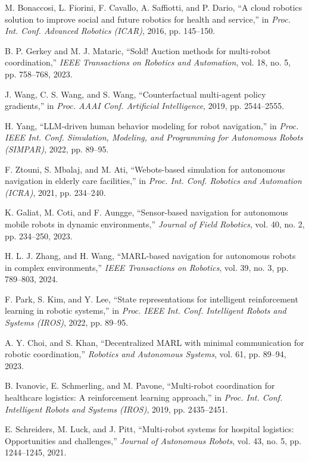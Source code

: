 \documentclass[conference]{IEEEtran}
\begin{document}
\begin{thebibliography}{1}
M. Bonaccosi, L. Fiorini, F. Cavallo, A. Saffiotti, and P. Dario, ``A cloud robotics solution to improve social and future robotics for health and service,'' in \emph{Proc. Int. Conf. Advanced Robotics (ICAR)}, 2016, pp. 145--150.

B. P. Gerkey and M. J. Mataric, ``Sold! Auction methods for multi-robot coordination,'' \emph{IEEE Transactions on Robotics and Automation}, vol. 18, no. 5, pp. 758--768, 2023.

J. Wang, C. S. Wang, and S. Wang, ``Counterfactual multi-agent policy gradients,'' in \emph{Proc. AAAI Conf. Artificial Intelligence}, 2019, pp. 2544--2555.

H. Yang, ``LLM-driven human behavior modeling for robot navigation,'' in \emph{Proc. IEEE Int. Conf. Simulation, Modeling, and Programming for Autonomous Robots (SIMPAR)}, 2022, pp. 89--95.

F. Ztouni, S. Mbalaj, and M. Ati, ``Webots-based simulation for autonomous navigation in elderly care facilities,'' in \emph{Proc. Int. Conf. Robotics and Automation (ICRA)}, 2021, pp. 234--240.

K. Galiat, M. Coti, and F. Aungge, ``Sensor-based navigation for autonomous mobile robots in dynamic environments,'' \emph{Journal of Field Robotics}, vol. 40, no. 2, pp. 234--250, 2023.

H. L. J. Zhang, and H. Wang, ``MARL-based navigation for autonomous robots in complex environments,'' \emph{IEEE Transactions on Robotics}, vol. 39, no. 3, pp. 789--803, 2024.

F. Park, S. Kim, and Y. Lee, ``State representations for intelligent reinforcement learning in robotic systems,'' in \emph{Proc. IEEE Int. Conf. Intelligent Robots and Systems (IROS)}, 2022, pp. 89--95.

A. Y. Choi, and S. Khan, ``Decentralized MARL with minimal communication for robotic coordination,'' \emph{Robotics and Autonomous Systems}, vol. 61, pp. 89--94, 2023.

B. Ivanovic, E. Schmerling, and M. Pavone, ``Multi-robot coordination for healthcare logistics: A reinforcement learning approach,'' in \emph{Proc. Int. Conf. Intelligent Robots and Systems (IROS)}, 2019, pp. 2435--2451.

E. Schreiders, M. Luck, and J. Pitt, ``Multi-robot systems for hospital logistics: Opportunities and challenges,'' \emph{Journal of Autonomous Robots}, vol. 43, no. 5, pp. 1244--1245, 2021.


\end{thebibliography}
\end{document}
